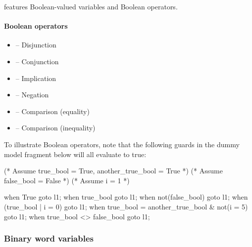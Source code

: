 \imitator{} features Boolean-valued variables and Boolean operators.

\paragraph{Boolean operators}

\begin{itemize}
	\item {} -- Disjunction
	\item {} -- Conjunction
	\item {} -- Implication
	\item {} -- Negation
	\item {} -- Comparison (equality)
	\item {} -- Comparison (inequality)
\end{itemize}



\begin{example}
	To illustrate Boolean operators, note that the following guards in the dummy model fragment below will all evaluate to true:

	\begin{IMITATORmodel}

		(* Assume true_bool = True, another_true_bool = True *)
		(* Assume false_bool = False *)
		(* Assume i = 1 *)

		when True goto l1;
		when true_bool goto l1;
		when not(false_bool) goto l1;
		when (true_bool | i = 0) goto l1;
		when true_bool = another_true_bool & not(i = 5) goto l1;
		when true_bool <> false_bool goto l1;

	\end{IMITATORmodel}
\end{example}



\subsubsection{Binary word variables}

